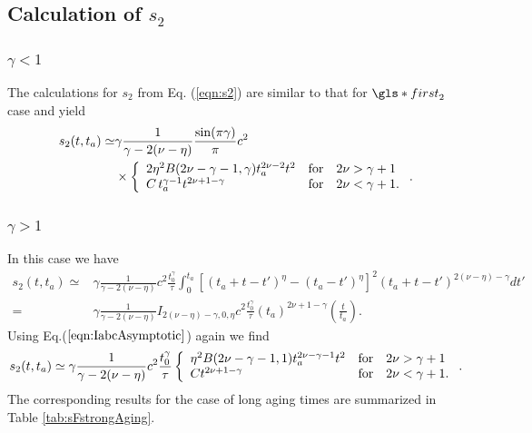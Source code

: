 \subsection*{Calculation of $s_2$}

\subsubsection{$\gamma<1$}
The calculations for $s_2$ from Eq. (\ref{eqn:s2}) are similar to that for $\gls*{first}_{2}$ case and yield
\begin{align}
s_{2}(t,t_a) \simeq & \gamma\frac{ 1}{\gamma-2(\nu-\eta)} \frac{\sin(\pi \gamma)}{\pi} c^2 \\
& \times  \left\{ \begin{array}{l l l}
2 \eta^2 B(2\nu -\gamma -1,\gamma)  t_a^{2\nu-2} t^2 & \mathrm{for}& 2\nu> \gamma+1\\
C \, t_a^{\gamma-1}t^{2\nu + 1-\gamma} & \mathrm{for} & 2\nu < \gamma+1.
\end{array} \right. .
\end{align}

\subsubsection{$\gamma>1$}
In this case we have 
\begin{align}
 s_{2}(t,t_a) \simeq& \gamma \frac{1}{\gamma-2(\nu-\eta)}c^2 \frac{t_0^{\gamma}}{\tau}  \int^{t_a}_{0} \left[ (t_a+t-t')^{\eta}-(t_a-t')^{\eta} \right]^2 (t_a+t-t')^{2(\nu-\eta)-\gamma} dt' \\
  =& \gamma \frac{1}{\gamma-2(\nu-\eta)}I_{2(\nu-\eta)-\gamma,0,\eta} c^2 \frac{t_0^{\gamma}}{\tau} (t_a)^{2\nu+1- \gamma} \left(\frac{t}{t_a}\right) .
\end{align}
Using Eq.($\ref{eqn:IabcAsymptotic}$) again we find
\begin{align}
s_{2}(t,t_a) \simeq \gamma \frac{1}{\gamma-2(\nu-\eta)} c^2 \frac{t_0^{\gamma}}{\tau}  \left\{ \begin{array}{l l l}
\eta^2  B(2\nu -\gamma -1,1)t_a^{2\nu -\gamma -1} t^2  &\mathrm{for} & 2\nu > \gamma +1 \\
C t^{2\nu +1-\gamma } & \mathrm{for} & 2\nu < \gamma + 1.
\end{array} \right. .
\end{align}
The corresponding results for the case of long aging times are summarized in Table \ref{tab:sFstrongAging}.


